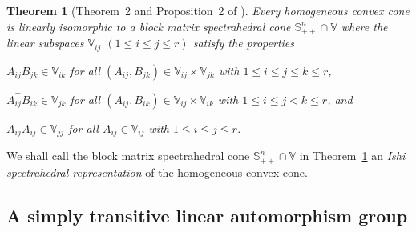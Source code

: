 \documentclass[oneside]{amsart}
\theoremstyle{plain}
\newtheorem{theorem}{Theorem}[section]
\theoremstyle{definition}
\theoremstyle{remark}
\numberwithin{equation}{section}
\begin{document}
\begin{theorem}[Theorem~2 and Proposition~2 of \cite{Ishi15}]
\label{theorem:Ishirepresentation}%
Every homogeneous convex cone is linearly isomorphic to a block matrix
spectrahedral cone $\mathbb{S}^{n}_{++} \cap \mathbb{V}$ where the linear
subspaces $\mathbb{V}_{ij}$ $(1 \leq i \leq j \leq r)$ satisfy the
properties
\begin{enumerate}[label={[V\arabic*]},ref={[V\arabic*]}]
\item\label{axiom:triangularproductblock}%
$A_{ij} B_{jk} \in \mathbb{V}_{ik}$ for all $(A_{ij}, B_{jk}) \in
\mathbb{V}_{ij} \times \mathbb{V}_{jk}$ with $1 \leq i \leq j \leq k \leq
r$,

\item\label{axiom:mixedtriangularproductblock}%
$A_{ij}^{\top} B_{ik} \in \mathbb{V}_{jk}$ for all $(A_{ij}, B_{ik}) \in
\mathbb{V}_{ij} \times \mathbb{V}_{ik}$ with $1 \leq i \leq j < k \leq r$,
and

\item\label{axiom:selfproductblock}%
$A_{ij}^{\top} A_{ij} \in \mathbb{V}_{jj}$ for all $A_{ij} \in
\mathbb{V}_{ij}$ with $1 \leq i \leq j \leq r$.

\end{enumerate}
\end{theorem}

We shall call the block matrix spectrahedral cone $\mathbb{S}^{n}_{++} \cap
\mathbb{V}$ in Theorem~\ref{theorem:Ishirepresentation} an \emph{Ishi
spectrahedral representation} of the homogeneous convex cone.

\subsection{A simply transitive linear automorphism group}
\label{section:simplytransitivegroup}
\end{document}
